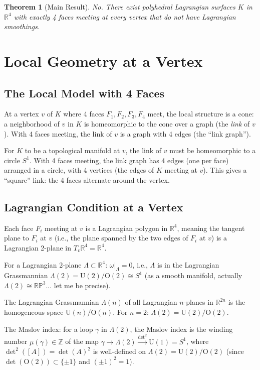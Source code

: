 \documentclass[12pt]{article}
\newtheorem{theorem}{Theorem}
\theoremstyle{definition}
\begin{document}
\begin{theorem}[Main Result]\label{thm:main}
No. There exist polyhedral Lagrangian surfaces $K$ in $\mathbb{R}^4$ with exactly 4 faces meeting at every vertex that do not have Lagrangian smoothings.
\end{theorem}

\section{Local Geometry at a Vertex}

\subsection{The Local Model with 4 Faces}

At a vertex $v$ of $K$ where 4 faces $F_1, F_2, F_3, F_4$ meet, the local structure is a cone: a neighborhood of $v$ in $K$ is homeomorphic to the cone over a graph (the \emph{link} of $v$). With 4 faces meeting, the link of $v$ is a graph with 4 edges (the ``link graph'').

For $K$ to be a topological manifold at $v$, the link of $v$ must be homeomorphic to a circle $S^1$. With 4 faces meeting, the link graph has 4 edges (one per face) arranged in a circle, with 4 vertices (the edges of $K$ meeting at $v$). This gives a ``square'' link: the 4 faces alternate around the vertex.

\subsection{Lagrangian Condition at a Vertex}

Each face $F_i$ meeting at $v$ is a Lagrangian polygon in $\mathbb{R}^4$, meaning the tangent plane to $F_i$ at $v$ (i.e., the plane spanned by the two edges of $F_i$ at $v$) is a Lagrangian 2-plane in $T_v\mathbb{R}^4 = \mathbb{R}^4$.

For a Lagrangian 2-plane $\Lambda\subset\mathbb{R}^4$: $\omega|_\Lambda = 0$, i.e., $\Lambda$ is in the Lagrangian Grassmannian $\Lambda(2) = \mathrm{U}(2)/\mathrm{O}(2) \cong S^1$ (as a smooth manifold, actually $\Lambda(2)\cong\mathbb{RP}^3$... let me be precise).

The Lagrangian Grassmannian $\Lambda(n)$ of all Lagrangian $n$-planes in $\mathbb{R}^{2n}$ is the homogeneous space $\mathrm{U}(n)/\mathrm{O}(n)$. For $n=2$: $\Lambda(2) = \mathrm{U}(2)/\mathrm{O}(2)$.

The Maslov index: for a loop $\gamma$ in $\Lambda(2)$, the Maslov index is the winding number $\mu(\gamma)\in\mathbb{Z}$ of the map $\gamma\to\Lambda(2)\xrightarrow{\det^2}\mathrm{U}(1) = S^1$, where $\det^2([A]) = \det(A)^2$ is well-defined on $\Lambda(2) = \mathrm{U}(2)/\mathrm{O}(2)$ (since $\det(\mathrm{O}(2))\subset\{\pm 1\}$ and $(\pm 1)^2 = 1$).
\end{document}
